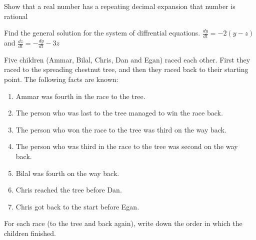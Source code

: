\documentclass{article}
\begin{document}
	\item
	Show that a real number has a repeating decimal expansion \iff that number is rational

	\item
	Find the general solution for the system of diffrential equations.
	$\frac{dy}{dt} = -2(y-z)$ and $\frac{dz}{dt} = -\frac{dy}{dt} - 3z$

	\item
	Five children (Ammar, Bilal, Chris, Dan and Egan) raced each other.  First they raced to the spreading chestnut tree, and then they raced back to their starting point. The following facts are known:
	\begin{enumerate}
		\item Ammar was fourth in the race to the tree.
		\item The person who was last to the tree managed to win the race back.
		\item The person who won the race to the tree was third on the way back.
		\item The person who was third in the race to the tree was second on the way back.
		\item Bilal was fourth on the way back.
		\item Chris reached the tree before Dan.
		\item Chris got back to the start before Egan.
	\end{enumerate}
	For  each  race  (to  the  tree  and  back  again),  write  down  the  order  in  which  the  children finished.

	\item

	\item

	\item
\end{document}
